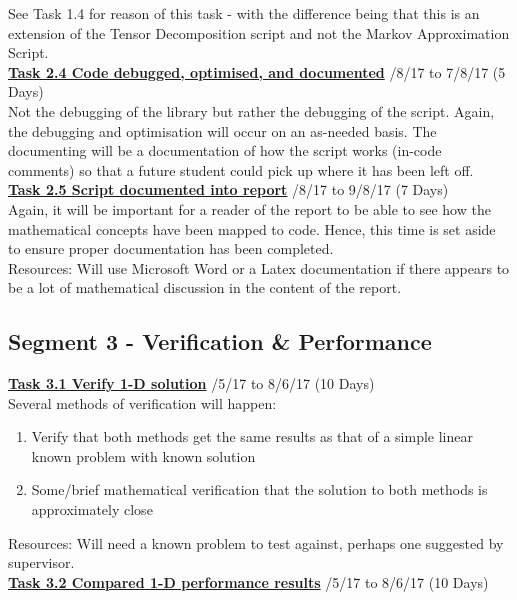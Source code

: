 \documentclass[11pt,draftd]{article}
\begin{document}
\begin{appendices}
	\noindent See Task 1.4 for reason of this task - with the difference being that this is an extension of the Tensor Decomposition script and not the Markov Approximation Script.\\
	
	\noindent\underline{\textbf{Task 2.4 Code debugged, optimised, and documented}} /8/17 to 7/8/17 (5 Days) \\
	
	\noindent Not the debugging of the library but rather the debugging of the script. Again, the debugging and optimisation will occur on an as-needed basis. The documenting will be a documentation of how the script works (in-code comments) so that a future student could pick up where it has been left off.\\
	
	\noindent\underline{\textbf{Task 2.5 Script documented into report}} /8/17 to 9/8/17 (7 Days) \\
	
	\noindent Again, it will be important for a reader of the report to be able to see how the mathematical concepts have been mapped to code. Hence, this time is set aside to ensure proper documentation has been completed. \\
	Resources: Will use Microsoft Word or a Latex documentation if there appears to be a lot of mathematical discussion in the content of the report.
	
	
	\subsection{Segment 3 - Verification \& Performance}
	\underline{\textbf{Task 3.1 Verify 1-D solution}} /5/17 to 8/6/17 (10 Days) \\
	
	\noindent Several methods of verification will happen:
	\begin{enumerate}
		\item Verify that both methods get the same results as that of a simple linear known problem with known solution
		\item Some/brief mathematical verification that the solution to both methods is approximately close
	\end{enumerate}
	Resources: Will need a known problem to test against, perhaps one suggested by supervisor.\\
	
	\noindent\underline{\textbf{Task 3.2 Compared 1-D performance results}} /5/17 to 8/6/17 (10 Days) \\
	

\end{appendices}
\end{document}
